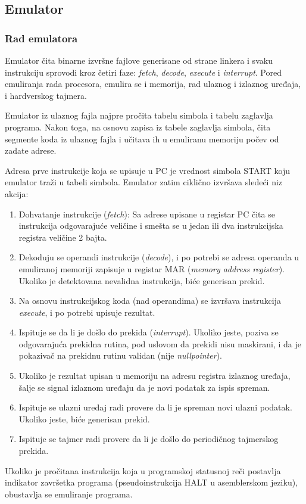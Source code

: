 \subsection{Emulator}

\subsubsection{Rad emulatora}
Emulator čita binarne izvršne fajlove generisane od strane linkera i svaku instrukciju
sprovodi kroz četiri faze: \textit{fetch}, \textit{decode}, \textit{execute} i
\textit{interrupt}. Pored emuliranja rada procesora, emulira se i memorija, rad ulaznog
i izlaznog uređaja, i hardverskog tajmera.

Emulator iz ulaznog fajla najpre pročita tabelu simbola i tabelu zaglavlja programa.
Nakon toga, na osnovu zapisa iz tabele zaglavlja simbola, čita segmente koda iz
ulaznog fajla i učitava ih u emuliranu memoriju počev od zadate adrese.

Adresa prve instrukcije koja se upisuje u PC je vrednost simbola START koju emulator
traži u tabeli simbola. Emulator zatim ciklično izvršava sledeći niz akcija:
\begin{enumerate}
    \item Dohvatanje instrukcije (\textit{fetch}): Sa adrese upisane u registar PC
          čita se instrukcija odgovarajuće veličine i smešta se u jedan ili dva
          instrukcijska registra veličine 2 bajta.
    \item Dekoduju se operandi instrukcije (\textit{decode}), i po potrebi se adresa
          ope\-randa u emuliranoj
          memoriji zapisuje u registar MAR (\textit{memory address register}). Ukoliko
          je detektovana nevalidna instrukcija, biće generisan prekid.
    \item Na osnovu instrukcijskog koda (nad operandima) se izvršava instrukcija
          \textit{execute}, i po potrebi upisuje rezultat.
    \item Ispituje se da li je došlo do prekida (\textit{interrupt}). Ukoliko jeste,
          poziva se odgovarajuća prekidna rutina, pod uslovom da prekidi nisu maskirani,
          i da je pokazivač na prekidnu rutinu validan (nije \textit{nullpointer}).
    \item Ukoliko je rezultat upisan u memoriju na adresu registra izlaznog ure\-đaja,
          šalje se signal izlaznom uređaju da je novi podatak za ispis spreman.
    \item Ispituje se ulazni uređaj radi provere da li je spreman novi ulazni podatak.
          Ukoliko jeste, biće generisan prekid.
    \item Ispituje se tajmer radi provere da li je došlo do periodičnog tajmerskog prekida.
\end{enumerate}
Ukoliko je pročitana instrukcija koja u programskoj statusnoj reči postavlja indikator
završetka programa (pseudoinstrukcija HALT u asemblerskom je\-ziku),
obustavlja se emuliranje programa.

